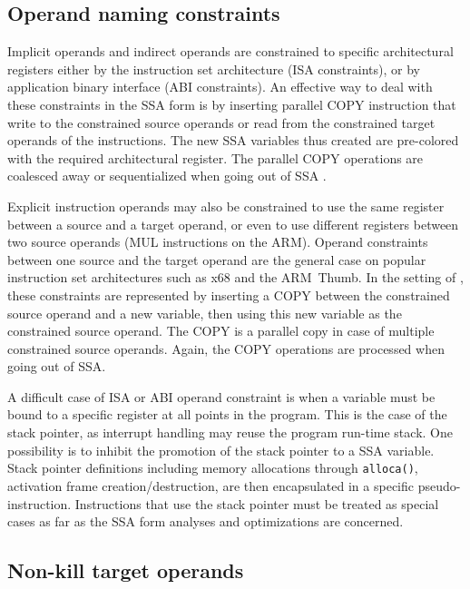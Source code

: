 \subsection{Operand naming constraints}

Implicit operands and indirect operands are constrained to specific
architectural registers either by the instruction set architecture (ISA
constraints), or by application binary interface (ABI constraints). An effective
way to deal with these constraints in the SSA form is by inserting parallel COPY
instruction that write to the constrained source operands or read from the
constrained target operands of the instructions. The new SSA variables thus
created are pre-colored with the required architectural register. The parallel
COPY operations are coalesced away or sequentialized when going out of SSA
\cite{Boissinot:2009:CGO}.

Explicit instruction operands may also be constrained to use the same register
between a source and a target operand, or even to use different registers
between two source operands (MUL instructions on the ARM). Operand constraints
between one source and the target operand are the general case on popular
instruction set architectures such as x68 and the ARM~Thumb. In the setting of
\cite{Boissinot:2009:CGO}, these constraints are represented by inserting a COPY
between the constrained source operand and a new variable, then using this new
variable as the constrained source operand. The COPY is a parallel copy in case
of multiple constrained source operands. Again, the COPY operations are
processed when going out of SSA.

A difficult case of ISA or ABI operand constraint is when a variable must be
bound to a specific register at all points in the program. This is the case of
the stack pointer, as interrupt handling may reuse the program run-time stack.
One possibility is to inhibit the promotion of the stack pointer to a SSA
variable. Stack pointer definitions including memory allocations through
\verb|alloca()|, activation frame creation/destruction, are then encapsulated in
a specific pseudo-instruction. Instructions that use the stack pointer must be
treated as special cases as far as the SSA form analyses and optimizations are
concerned.

\subsection{Non-kill target operands} \label{sec:non-kill-target}

